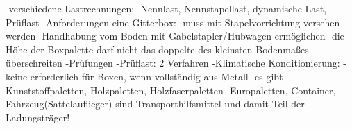                 -verschiedene Lastrechnungen:
                    -Nennlast, Nennstapellast, dynamische Last, Prüflast
                -Anforderungen eine Gitterbox:
                    -muss mit Stapelvorrichtung versehen werden
                    -Handhabung vom Boden mit Gabelstapler/Hubwagen ermöglichen
                    -die Höhe der Boxpalette darf nicht das doppelte des kleinsten Bodenmaßes überschreiten
                -Prüfungen
                    -Prüflast: 2 Verfahren
                    -Klimatische Konditionierung:
                        -keine erforderlich für Boxen, wenn vollständig aus Metall
                -es gibt Kunststoffpaletten, Holzpaletten, Holzfaserpaletten
            -Europaletten, Container, Fahrzeug(Sattelauflieger) sind Transporthilfsmittel und damit Teil der Ladungsträger!
            
